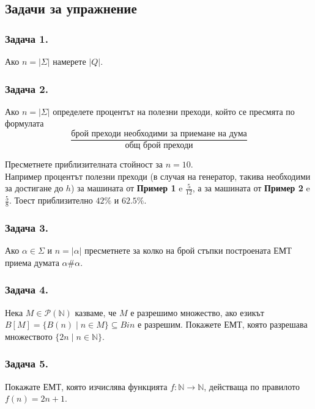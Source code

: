 \documentclass[14pt]{extarticle}
\begin{document}
\subsection*{Задачи за упражнение}

\subsubsection*{Задача 1.}
Ако \(n = |\Sigma|\) намерете \(|Q|\).

\subsubsection*{Задача 2.}
Ако \(n = |\Sigma|\) определете процентът на полезни преходи, който се пресмята по формулата
\[\displaystyle\frac{\text{брой преходи необходими за приемане на дума}}{\text{общ брой преходи}}\]

Пресметнете приблизителната стойност за \(n = 10\). \\

Например процентът полезни преходи (в случая на генератор, такива необходими за достигане до \(h\)) за машината от \textbf{Пример 1} e \(\frac{5}{12}\),
а за машината от \textbf{Пример 2} e \(\frac{5}{8}\). Тоест приблизително \(42\%\) и \(62.5\%\).

\subsubsection*{Задача 3.}
Ако \(\alpha \in \Sigma\) и \(n = |\alpha|\) пресметнете за колко на брой стъпки построената ЕМТ приема думата \(\alpha\#\alpha\).

\subsubsection*{Задача 4.}
Нека \(M \in \mathcal{P}(\mathbb N)\) казваме, че \(M\) е разрешимо множество,
ако езикът \(B[M] = \{B(n) \mid n \in M\} \subseteq Bin\) е разрешим.
Покажете ЕМТ, която разрешава множеството \(\{2n \mid n \in \mathbb N\}\).

\subsubsection*{Задача 5.}
Покажате ЕМТ, която изчислява функцията \(f : \mathbb N \to \mathbb N\), действаща по правилото \(f(n) = 2n + 1\).
\end{document}
